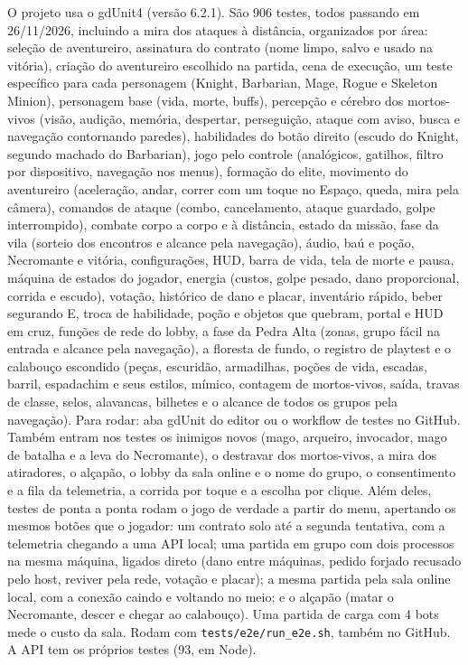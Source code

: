 \documentclass[11pt,a4paper]{article}
\begin{document}
O projeto usa o gdUnit4 (versão 6.2.1). São 906 testes, todos passando em 26/11/2026, incluindo a mira dos ataques à distância, organizados por área: seleção de aventureiro, assinatura do contrato (nome limpo, salvo e usado na vitória), criação do aventureiro escolhido na partida, cena de execução, um teste específico para cada personagem (Knight, Barbarian, Mage, Rogue e Skeleton Minion), personagem base (vida, morte, buffs), percepção e cérebro dos mortos-vivos (visão, audição, memória, despertar, perseguição, ataque com aviso, busca e navegação contornando paredes), habilidades do botão direito (escudo do Knight, segundo machado do Barbarian), jogo pelo controle (analógicos, gatilhos, filtro por dispositivo, navegação nos menus), formação do elite, movimento do aventureiro (aceleração, andar, correr com um toque no Espaço, queda, mira pela câmera), comandos de ataque (combo, cancelamento, ataque guardado, golpe interrompido), combate corpo a corpo e à distância, estado da missão, fase da vila (sorteio dos encontros e alcance pela navegação), áudio, baú e poção, Necromante e vitória, configurações, HUD, barra de vida, tela de morte e pausa, máquina de estados do jogador, energia (custos, golpe pesado, dano proporcional, corrida e escudo), votação, histórico de dano e placar, inventário rápido, beber segurando E, troca de habilidade, poção e objetos que quebram, portal e HUD em cruz, funções de rede do lobby, a fase da Pedra Alta (zonas, grupo fácil na entrada e alcance pela navegação), a floresta de fundo, o registro de playtest e o calabouço escondido (peças, escuridão, armadilhas, poções de vida, escadas, barril, espadachim e seus estilos, mímico, contagem de mortos-vivos, saída, travas de classe, selos, alavancas, bilhetes e o alcance de todos os grupos pela navegação). Para rodar: aba gdUnit do editor ou o workflow de testes no GitHub. Também entram nos testes os inimigos novos (mago, arqueiro, invocador, mago de batalha e a leva do Necromante), o destravar dos mortos-vivos, a mira dos atiradores, o alçapão, o lobby da sala online e o nome do grupo, o consentimento e a fila da telemetria, a corrida por toque e a escolha por clique. Além deles, testes de ponta a ponta rodam o jogo de verdade a partir do menu, apertando os mesmos botões que o jogador: um contrato solo até a segunda tentativa, com a telemetria chegando a uma API local; uma partida em grupo com dois processos na mesma máquina, ligados direto (dano entre máquinas, pedido forjado recusado pelo host, reviver pela rede, votação e placar); a mesma partida pela sala online local, com a conexão caindo e voltando no meio; e o alçapão (matar o Necromante, descer e chegar ao calabouço). Uma partida de carga com 4 bots mede o custo da sala. Rodam com \texttt{tests/e2e/run\_e2e.sh}, também no GitHub. A API tem os próprios testes (93, em Node).
\end{document}
